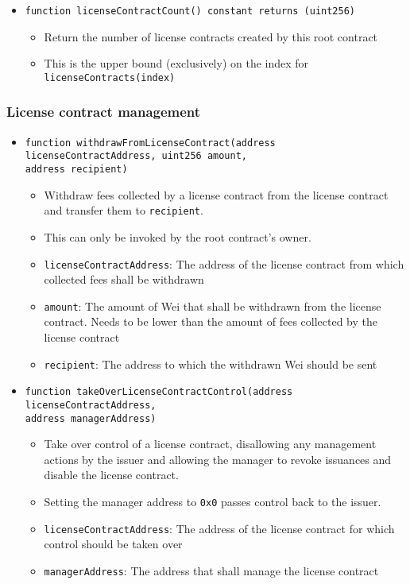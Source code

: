 \documentclass[a4paper]{article}
\begin{document}
\begin{itemize}
  \item \texttt{function licenseContractCount() constant returns (uint256)}
  \begin{itemize}
    \item Return the number of license contracts created by this root contract
    \item This is the upper bound (exclusively) on the index for \texttt{licenseContracts(index)}
  \end{itemize}
\end{itemize}

\subsubsection{License contract management}

\begin{itemize}
  \item \texttt{function withdrawFromLicenseContract(address licenseContractAddress, uint256 amount, \\address recipient)}
  \begin{itemize}
    \item Withdraw fees collected by a license contract from the license contract and transfer them to \texttt{recipient}.
    \item This can only be invoked by the root contract's owner.
    \item \texttt{licenseContractAddress}: The address of the license contract from which collected fees shall be withdrawn
    \item \texttt{amount}: The amount of Wei that shall be withdrawn from the license contract. Needs to be lower than the amount of fees collected by the license contract
    \item \texttt{recipient}: The address to which the withdrawn Wei should be sent
  \end{itemize}
  
  \item \texttt{function takeOverLicenseContractControl(address licenseContractAddress, \\address managerAddress)}
  \begin{itemize}
    \item Take over control of a license contract, disallowing any management actions by the issuer and allowing the manager to revoke issuances and disable the license contract.
    \item Setting the manager address to \texttt{0x0} passes control back to the issuer.
    \item \texttt{licenseContractAddress}: The address of the license contract for which control should be taken over
    \item \texttt{managerAddress}: The address that shall manage the license contract
  \end{itemize}
\end{itemize}
\end{document}
